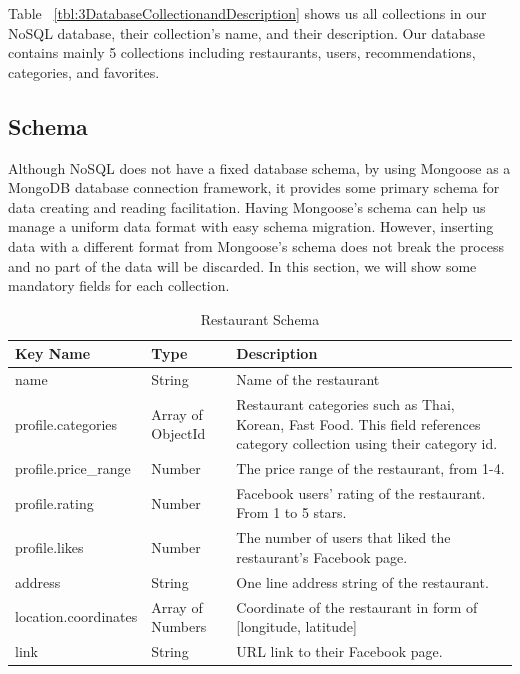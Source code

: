 \documentclass[12pt,oneside,openright,a4paper]{cpe-english-project}
\begin{document}
Table ~\ref{tbl:3DatabaseCollectionandDescription} shows us all collections in our NoSQL database, their collection’s name, and their description. Our database contains mainly 5 collections including restaurants, users, recommendations, categories, and favorites.

\subsection{Schema}

Although NoSQL does not have a fixed database schema, by using Mongoose as a MongoDB database connection framework, it provides some primary schema for data creating and reading facilitation. Having Mongoose’s schema can help us manage a uniform data format with easy schema migration. However, inserting data with a different format from Mongoose’s schema does not break the process and no part of the data will be discarded. In this section, we will show some mandatory fields for each collection.


\begin{table}[H]
\caption{Restaurant Schema}\label{tbl:3RestaurantSchema}
\begin{tabularx}{\textwidth}{l|l|X} \hline\hline
Key Name & Type & Description \\ \hline\hline
name & String & Name of the restaurant \\ \hline
profile.categories & Array of ObjectId & Restaurant categories such as Thai, Korean, Fast Food. This field references category collection using their category id. \\ \hline
profile.price\_range & Number & The price range of the restaurant, from 1-4. \\ \hline
profile.rating & Number & Facebook users’ rating of the restaurant. From 1 to 5 stars. \\ \hline
profile.likes & Number & The number of users that liked the restaurant’s Facebook page. \\ \hline
address & String & One line address string of the restaurant. \\ \hline
location.coordinates & Array of Numbers & Coordinate of the restaurant in form of [longitude, latitude] \\ \hline
link & String & URL link to their Facebook page. \\ \hline\hline
\end{tabularx}
\end{table}
\end{document}
